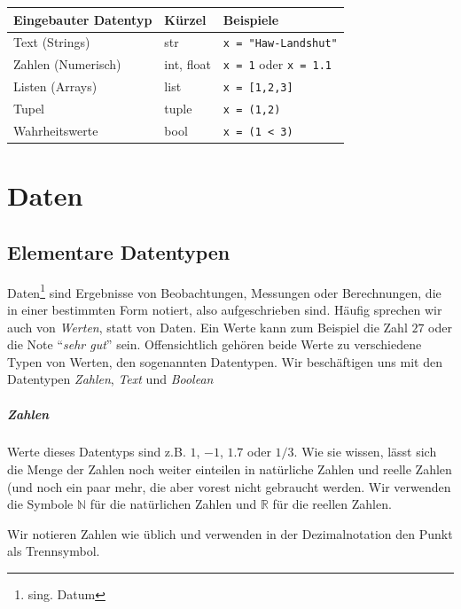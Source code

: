 \documentclass[
  oneside]{book}
\begin{document}
\begin{longtable}[]{@{}lll@{}}
\toprule
Eingebauter Datentyp & Kürzel & Beispiele \\
\midrule
\endhead
Text (Strings) & str & \texttt{x\ =\ "Haw-Landshut"} \\
Zahlen (Numerisch) & int, float & \texttt{x\ =\ 1} oder \texttt{x\ =\ 1.1} \\
Listen (Arrays) & list & \texttt{x\ =\ {[}1,2,3{]}} \\
Tupel & tuple & \texttt{x\ =\ (1,2)} \\
Wahrheitswerte & bool & \texttt{x\ =\ (1\ \textless{}\ 3)} \\
\bottomrule
\end{longtable}

\hypertarget{daten}{%
\chapter{Daten}\label{daten}}

\hypertarget{elementare-datentypen}{%
\section{Elementare Datentypen}\label{elementare-datentypen}}

Daten\footnote{sing. Datum} sind Ergebnisse von Beobachtungen, Messungen oder Berechnungen, die in einer bestimmten Form notiert, also aufgeschrieben sind. Häufig sprechen wir auch von \emph{Werten}, statt von Daten. Ein Werte kann zum Beispiel die Zahl \(27\) oder die Note ``\emph{sehr gut}'' sein. Offensichtlich gehören beide Werte zu verschiedene Typen von Werten, den sogenannten Datentypen. Wir beschäftigen uns mit den Datentypen \emph{Zahlen}, \emph{Text} und \emph{Boolean}

\hypertarget{zahlen}{%
\paragraph{Zahlen}\label{zahlen}}

Werte dieses Datentyps sind z.B. \(1\), \(-1\), \(1.7\) oder \(1/3\). Wie sie wissen, lässt sich die Menge der Zahlen noch weiter einteilen in natürliche Zahlen und reelle Zahlen (und noch ein paar mehr, die aber vorest nicht gebraucht werden. Wir verwenden die Symbole \(\mathbb{N}\) für die natürlichen Zahlen und \(\mathbb{R}\) für die reellen Zahlen.

Wir notieren Zahlen wie üblich und verwenden in der Dezimalnotation den Punkt als Trennsymbol.
\end{document}
